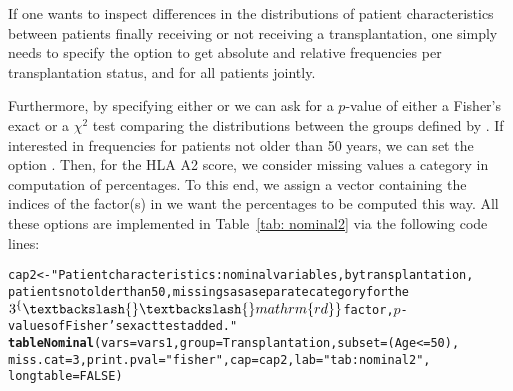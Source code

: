 \documentclass[nojss]{jss}\usepackage[]{graphicx}\usepackage[]{color}
\makeatletter
\newcommand{\hlnum}[1]{\textcolor[rgb]{0.686,0.059,0.569}{#1}}%
\newcommand{\hlstr}[1]{\textcolor[rgb]{0.192,0.494,0.8}{#1}}%
\newcommand{\hlopt}[1]{\textcolor[rgb]{0,0,0}{#1}}%
\newcommand{\hlstd}[1]{\textcolor[rgb]{0.345,0.345,0.345}{#1}}%
\newcommand{\hlkwb}[1]{\textcolor[rgb]{0.69,0.353,0.396}{#1}}%
\newcommand{\hlkwc}[1]{\textcolor[rgb]{0.333,0.667,0.333}{#1}}%
\newcommand{\hlkwd}[1]{\textcolor[rgb]{0.737,0.353,0.396}{\textbf{#1}}}%
\newenvironment{kframe}{%
 \def\at@end@of@kframe{}%
 \ifinner\ifhmode%
  \def\at@end@of@kframe{\end{minipage}}%
  \begin{minipage}{\columnwidth}%
 \fi\fi%
 \def\FrameCommand##1{\hskip\@totalleftmargin \hskip-\fboxsep
 \colorbox{shadecolor}{##1}\hskip-\fboxsep
     \hskip-\linewidth \hskip-\@totalleftmargin \hskip\columnwidth}%
 \MakeFramed {\advance\hsize-\width
   \@totalleftmargin\z@ \linewidth\hsize
   \@setminipage}}%
 {\par\unskip\endMakeFramed%
 \at@end@of@kframe}
\newenvironment{knitrout}{}{} %
\makeatother
\begin{document}
If one wants to inspect differences in the distributions of patient characteristics
between patients finally receiving or not receiving a transplantation,
one simply needs to specify the option  to get absolute and relative frequencies 
per transplantation status, and for all patients jointly. %

Furthermore, by specifying either  
or  we can ask for a $p$-value
of either a Fisher's exact or a $\chi^2$ test comparing the distributions between the groups defined by .
If interested in frequencies for patients not older than 50 years, we can set the option . 
Then, for the HLA A2 score, we consider missing values a category in computation of percentages. To this end, we assign
 a vector containing the indices of the factor(s) in  we want the percentages to be computed 
this way. All these options are implemented in Table~\ref{tab: nominal2} via the following code lines:

\begin{knitrout}\footnotesize
{}\color{fgcolor}\begin{kframe}
\begin{alltt}
\hlstd{cap2} \hlkwb{<-} \hlstr{"Patient characteristics: nominal variables, by transplantation, 
  patients not older than 50, missings as a separate category for the 
  $3^\{\textbackslash{}\textbackslash{}mathrm\{rd\}\}$ factor, $p$-values of Fisher's exact test added."}
\hlkwd{tableNominal}\hlstd{(}\hlkwc{vars} \hlstd{= vars1,} \hlkwc{group} \hlstd{= Transplantation,} \hlkwc{subset} \hlstd{= (Age} \hlopt{<=} \hlnum{50}\hlstd{),}
  \hlkwc{miss.cat} \hlstd{=} \hlnum{3}\hlstd{,} \hlkwc{print.pval} \hlstd{=} \hlstr{"fisher"}\hlstd{,} \hlkwc{cap} \hlstd{= cap2,} \hlkwc{lab} \hlstd{=} \hlstr{"tab: nominal2"}\hlstd{,}
  \hlkwc{longtable} \hlstd{=} \hlnum{FALSE}\hlstd{)}
\end{alltt}
\end{kframe}
\end{knitrout}

\pagebreak
\end{document}
